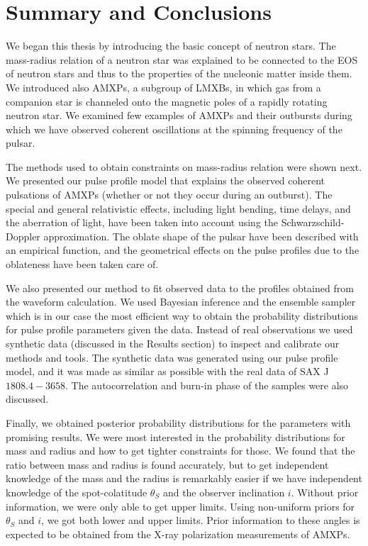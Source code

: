 \documentclass{wihuri}
\def\source{SAX J$1808.4-3658$}
\def\thetas{\theta_{S}}
\begin{document}
\clearpage


\section{Summary and Conclusions}

We began this thesis by introducing the basic concept of neutron stars. The mass-radius relation of a neutron star was explained to be connected to the EOS of neutron stars and thus to the properties of the nucleonic matter inside them. We introduced also AMXPs, a subgroup of LMXBs, in which gas from a companion star is channeled onto the magnetic poles of a rapidly rotating neutron star. We examined few examples of AMXPs and their outbursts during which we have observed coherent oscillations at the spinning frequency of the pulsar.

The methods used to obtain constraints on mass-radius relation were shown next. We presented our pulse profile model that explains the observed coherent pulsations of AMXPs (whether or not they occur during an outburst). %
The special and general relativistic effects, including light bending, time delays, and the aberration of light, have been taken into account using the Schwarzschild-Doppler approximation. The oblate shape of the pulsar have been described with an empirical function, and the geometrical effects on the pulse profiles due to the oblateness have been taken care of. 

We also presented our method to fit observed data to the profiles obtained from the waveform calculation. We used Bayesian inference and the ensemble sampler which is in our case the most efficient way to obtain the probability distributions for pulse profile parameters given the data. Instead of real observations we used synthetic data (discussed in the Results section) to inspect and calibrate our methods and tools. The synthetic data was generated using our pulse profile model, and it was made as similar as possible with the real data of \source. The autocorrelation and burn-in phase of the samples were also discussed.

Finally, we obtained posterior probability distributions for the parameters with promising results. We were most interested in the probability distributions for mass and radius and how to get tighter constraints for those. We found that the ratio between mass and radius is found accurately, but to get independent knowledge of the mass and the radius is remarkably easier if we have independent knowledge of the spot-colatitude $\thetas$ and the observer inclination $i$. Without prior information, we were only able to get upper limits. Using non-uniform priors for $\thetas$ and $i$, we got both lower and upper limits. Prior information to these angles is expected to be obtained from the X-ray polarization measurements of AMXPs.  
\end{document}
